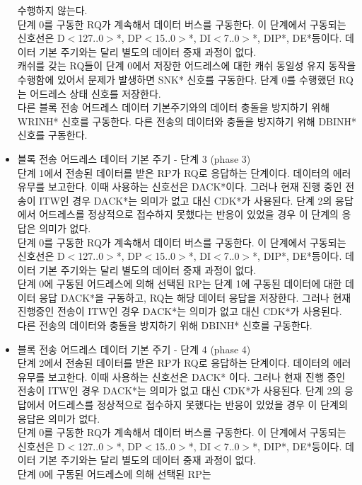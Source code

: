 \begin{itemize}
	수행하지 않는다. \\
	단계 0를 구동한 RQ가 계속해서 데이터 버스를 구동한다.
	이 단계에서 구동되는 신호선은 D$<$127..0$>$*,
	DP$<$15..0$>$*, DI$<$7..0$>$*, DIP*, DE*등이다.
	데이터 기본 주기와는 달리 별도의 데이터 중재 과정이 없다. \\
	캐쉬를 갖는 RQ들이 단계 0에서 저장한 어드레스에 대한 
	캐쉬 동일성 유지 동작을 수행함에 있어서 문제가 발생하면 SNK* 신호를 구동한다.
	단계 0를 수행했던 RQ는 어드레스 상태 신호를 저장한다. \\
	다른 블록 전송 어드레스 데이터 기본주기와의 데이터 충돌을 방지하기 위해 WRINH* 신호를 구동한다.
	다른 전송의 데이터와 충돌을 방지하기 위해 DBINH* 신호를 구동한다.
%
	\item 블록 전송 어드레스 데이터 기본 주기 - 단계 3 (phase 3)\\
	단계 1에서 전송된 데이터를 받은 RP가 RQ로 응답하는 단계이다.
	데이터의 에러 유무를 보고한다. 이때 사용하는 신호선은 DACK*이다.
	그러나 현재 진행 중인 전송이 ITW인 경우 DACK*는 의미가 없고 대신 CDK*가 사용된다.
	단계 2의 응답에서 어드레스를 정상적으로 접수하지 못했다는 반응이 있었을 경우
	이 단계의 응답은 의미가 없다. \\
	단계 0를 구동한 RQ가 계속해서 데이터 버스를 구동한다.
	이 단계에서 구동되는 신호선은 D$<$127..0$>$*,
	DP$<$15..0$>$*, DI$<$7..0$>$*, DIP*, DE*등이다.
	데이터 기본 주기와는 달리 별도의 데이터 중재 과정이 없다. \\
	단계 0에 구동된 어드레스에 의해 선택된 RP는
	단계 1에 구동된 데이터에 대한 데이터 응답 DACK*을 구동하고,
	RQ는 해당 데이터 응답을 저장한다.
	그러나 현재 진행중인 전송이 ITW인 경우 DACK*는 의미가 없고 대신 CDK*가 사용된다.\\
	다른 전송의 데이터와 충돌을 방지하기 위해 DBINH* 신호를 구동한다.
%
	\item 블록 전송 어드레스 데이터 기본 주기 - 단계 4 (phase 4)\\
	단계 2에서 전송된 데이터를 받은 RP가 RQ로 응답하는 단계이다.
	데이터의 에러 유무를 보고한다. 이때 사용하는 신호선은 DACK* 이다.
	그러나 현재 진행 중인 전송이 ITW인 경우 DACK*는 의미가 없고 대신 CDK*가 사용된다.
	단계 2의 응답에서 어드레스를 정상적으로 접수하지 못했다는 반응이 있었을 경우
	이 단계의 응답은 의미가 없다. \\
	단계 0를 구동한 RQ가 계속해서 데이터 버스를 구동한다.
	이 단계에서 구동되는 신호선은 D$<$127..0$>$*,
	DP$<$15..0$>$*, DI$<$7..0$>$*, DIP*, DE*등이다.
	데이터 기본 주기와는 달리 별도의 데이터 중재 과정이 없다. \\
	단계 0에 구동된 어드레스에 의해 선택된 RP는

\end{itemize}
